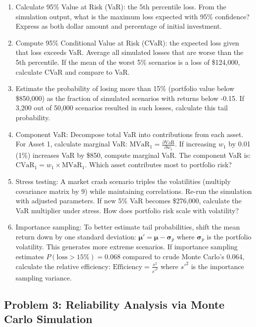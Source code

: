 \documentclass[12pt]{article}
\begin{document}
\begin{enumerate}[label=(\alph*)]
\item Calculate 95\% Value at Risk (VaR): the 5th percentile loss. From the simulation output, what is the maximum loss expected with 95\% confidence? Express as both dollar amount and percentage of initial investment.

\item Compute 95\% Conditional Value at Risk (CVaR): the expected loss given that loss exceeds VaR. Average all simulated losses that are worse than the 5th percentile. If the mean of the worst 5\% scenarios is a loss of \$124,000, calculate CVaR and compare to VaR.

\item Estimate the probability of losing more than 15\% (portfolio value below \$850,000) as the fraction of simulated scenarios with returns below -0.15. If 3,200 out of 50,000 scenarios resulted in such losses, calculate this tail probability.

\item Component VaR: Decompose total VaR into contributions from each asset. For Asset 1, calculate marginal VaR: $\text{MVaR}_1 = \frac{\partial \text{VaR}}{\partial w_1}$. If increasing $w_1$ by 0.01 (1\%) increases VaR by \$850, compute marginal VaR. The component VaR is: $\text{CVaR}_1 = w_1 \times \text{MVaR}_1$. Which asset contributes most to portfolio risk?

\item Stress testing: A market crash scenario triples the volatilities (multiply covariance matrix by 9) while maintaining correlations. Re-run the simulation with adjusted parameters. If new 5\% VaR becomes \$276,000, calculate the VaR multiplier under stress. How does portfolio risk scale with volatility?

\item Importance sampling: To better estimate tail probabilities, shift the mean return down by one standard deviation: $\boldsymbol{\mu}' = \boldsymbol{\mu} - \boldsymbol{\sigma}_p$ where $\boldsymbol{\sigma}_p$ is the portfolio volatility. This generates more extreme scenarios. If importance sampling estimates $P(\text{loss} > 15\%) = 0.068$ compared to crude Monte Carlo's 0.064, calculate the relative efficiency: $\text{Efficiency} = \frac{s^2}{s'^2}$ where $s'^2$ is the importance sampling variance.
\end{enumerate}

\subsection*{Problem 3: Reliability Analysis via Monte Carlo Simulation}
\end{document}
